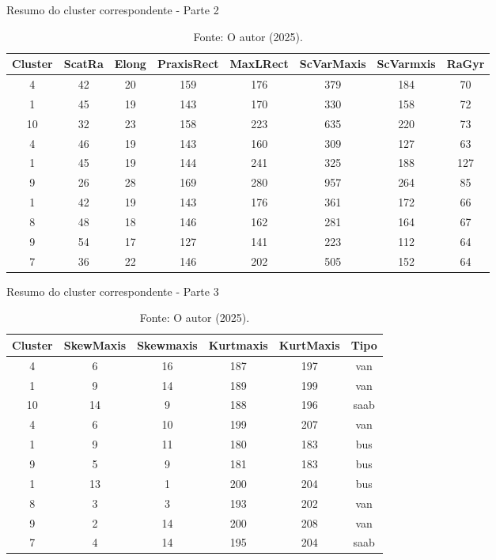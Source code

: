 \begin{table}[H]
\centering
\caption{Resumo do cluster correspondente - Parte 2}
\begin{tabular}{|c|c|c|c|c|c|c|c|}
\hline
Cluster & ScatRa & Elong & PraxisRect & MaxLRect & ScVarMaxis & ScVarmxis & RaGyr \\ \hline
4  & 42 & 20 & 159 & 176 & 379 & 184 & 70 \\ \hline
1  & 45 & 19 & 143 & 170 & 330 & 158 & 72 \\ \hline
10 & 32 & 23 & 158 & 223 & 635 & 220 & 73 \\ \hline
4  & 46 & 19 & 143 & 160 & 309 & 127 & 63 \\ \hline
1  & 45 & 19 & 144 & 241 & 325 & 188 & 127 \\ \hline
9  & 26 & 28 & 169 & 280 & 957 & 264 & 85 \\ \hline
1  & 42 & 19 & 143 & 176 & 361 & 172 & 66 \\ \hline
8  & 48 & 18 & 146 & 162 & 281 & 164 & 67 \\ \hline
9  & 54 & 17 & 127 & 141 & 223 & 112 & 64 \\ \hline
7  & 36 & 22 & 146 & 202 & 505 & 152 & 64 \\ \hline
\end{tabular}
\caption*{Fonte: O autor (2025).}
\end{table}

\begin{table}[H]
\centering
\caption{Resumo do cluster correspondente - Parte 3}
\begin{tabular}{|c|c|c|c|c|c|}
\hline
Cluster & SkewMaxis & Skewmaxis & Kurtmaxis & KurtMaxis & Tipo \\ \hline
4  & 6  & 16 & 187 & 197 & van  \\ \hline
1  & 9  & 14 & 189 & 199 & van  \\ \hline
10 & 14 & 9  & 188 & 196 & saab \\ \hline
4  & 6  & 10 & 199 & 207 & van  \\ \hline
1  & 9  & 11 & 180 & 183 & bus  \\ \hline
9  & 5  & 9  & 181 & 183 & bus  \\ \hline
1  & 13 & 1  & 200 & 204 & bus  \\ \hline
8  & 3  & 3  & 193 & 202 & van  \\ \hline
9  & 2  & 14 & 200 & 208 & van  \\ \hline
7  & 4  & 14 & 195 & 204 & saab \\ \hline
\end{tabular}
\caption*{Fonte: O autor (2025).}
\end{table}



